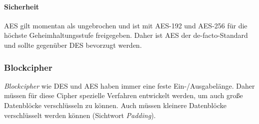 				\paragraph{Sicherheit}
					AES gilt momentan als ungebrochen und ist mit AES-192 und AES-256 für die höchste Geheimhaltungsstufe freigegeben. Daher ist AES der de-facto-Standard und sollte gegenüber DES bevorzugt werden.

            \subsubsection{Blockcipher}
                \textit{Blockcipher} wie DES und AES haben immer eine feste Ein-/Ausgabelänge. Daher müssen für diese Cipher spezielle Verfahren entwickelt werden, um auch große Datenblöcke verschlüsseln zu können. Auch müssen kleinere Datenblöcke verschlüsselt werden können (Sichtwort \textit{Padding}).

